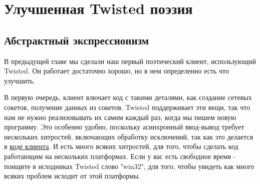 
\section{Улучшенная Twisted поэзия\label{sec:part5}}


\subsection{Абстрактный экспрессионизм}


В предыдущей главе мы сделали наш первый поэтический клиент, 
использующий Twisted. Он работает достаточно хорошо, но в нем определенно 
есть что улучшить.




В первую очередь, клиент влючает код с такими деталями, 
как создание сетевых сокетов, получение данных из 
сокетов. Twisted поддерживает эти вещи, так что нам не нужно 
реализовывать их самим каждый раз, когда мы пишем новую программу. 
Это особенно удобно, поскольку асинхронный ввод-вывод 
требует нескольких хитростей, включающих обработку исключений, так как это 
делается в 
\href{http://github.com/jdavisp3/twisted-intro/blob/master/twisted-client-1/get-poetry.py}{коде клиента}. 
И есть много всяких хитростей, для того, чтобы сделать код 
работающим на нескольких платформах. Если у вас есть свободное 
время - поищите в исходниках Twisted слово "win32", для того, чтобы 
увидеть как много всяких проблем исходит от этой платформы.




